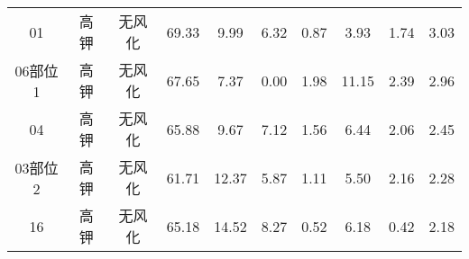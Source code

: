 \documentclass[withoutpreface,bwprint]{cumcmthesis} %
\begin{document}
\begin{appendices}
\begin{table}[!h]
\begin{tabular}{@{}cccccccccc@{}}
		01                                                        & 高钾          & 无风化                                                      & 69.33                                                          & 9.99                                                         & 6.32                                                         & 0.87                                                         & 3.93                                                           & 1.74                                                           & 3.03                                                            \\
		06部位1                                                     & 高钾          & 无风化                                                      & 67.65                                                          & 7.37                                                         & 0.00                                                         & 1.98                                                         & 11.15                                                          & 2.39                                                           & 2.96                                                            \\
		04                                                        & 高钾          & 无风化                                                      & 65.88                                                          & 9.67                                                         & 7.12                                                         & 1.56                                                         & 6.44                                                           & 2.06                                                           & 2.45                                                            \\
		03部位2                                                     & 高钾          & 无风化                                                      & 61.71                                                          & 12.37                                                        & 5.87                                                         & 1.11                                                         & 5.50                                                           & 2.16                                                           & 2.28                                                            \\
		16                                                        & 高钾          & 无风化                                                      & 65.18                                                          & 14.52                                                        & 8.27                                                         & 0.52                                                         & 6.18                                                           & 0.42                                                           & 2.18                                                            \\

\end{tabular}
\end{table}
\end{appendices}
\end{document}
